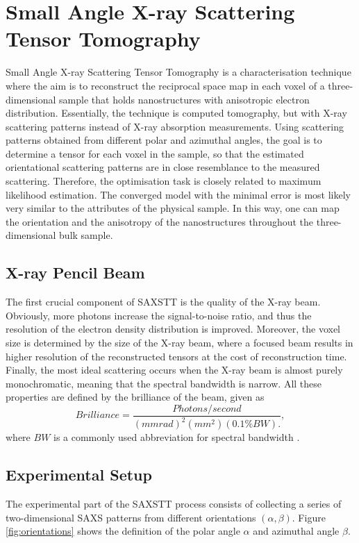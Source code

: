 \chapter{Small Angle X-ray Scattering Tensor Tomography}
\label{chap:SAXSTT}

Small Angle X-ray Scattering Tensor Tomography is a characterisation technique where the aim is to reconstruct the reciprocal space map in each voxel of a three-dimensional sample
that holds nanostructures with anisotropic electron distribution. Essentially, the technique is computed tomography, but with X-ray scattering patterns instead of X-ray absorption measurements.
Using scattering patterns obtained from different polar and azimuthal angles, the goal is to determine a tensor for each voxel in the sample,
so that the estimated orientational scattering patterns are in close resemblance to the measured scattering.
Therefore, the optimisation task is closely related to maximum likelihood estimation. The converged model with the minimal error is most likely very similar to the attributes of the physical sample.
In this way, one can map the orientation and the anisotropy of the nanostructures throughout the three-dimensional bulk sample.

\section{X-ray Pencil Beam} %
The first crucial component of SAXSTT is the quality of the X-ray beam.
Obviously, more photons increase the signal-to-noise ratio, and thus the resolution of the electron density distribution is improved.
Moreover, the voxel size is determined by the size of the X-ray beam, where a focused beam results in higher resolution of the reconstructed tensors at the cost of reconstruction time.
Finally, the most ideal scattering occurs when the X-ray beam is almost purely monochromatic, meaning that the spectral bandwidth is narrow.
All these properties are defined by the brilliance of the beam, given as
\begin{equation}\label{eq:brilliance}
    Brilliance = \frac{Photons/second}{\left( mmrad \right)^{2} \left( mm^{2} \right) \left( 0.1\% BW \right).},
\end{equation}
where $BW$ is a commonly used abbreviation for spectral bandwidth \cite{mcmorrow2011elements}.

\section{Experimental Setup}
The experimental part of the SAXSTT process consists of collecting a series of two-dimensional SAXS patterns from different orientations $\left(\alpha,\beta\right)$.
Figure \ref{fig:orientations} shows the definition of the polar angle $\alpha$ and azimuthal angle $\beta$.


